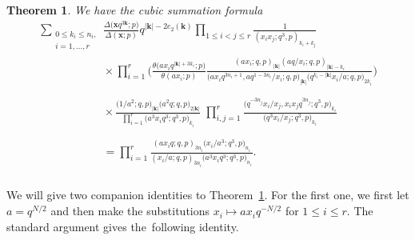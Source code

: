 \documentclass[pdftex]{sigma}%
\numberwithin{equation}{section}
\newtheorem{Theorem}{Theorem}[section]
\def\ta{\theta}
\newcommand\bk{\mathbf k}
\newcommand\bx{\mathbf x}
\begin{document}
\begin{Theorem}\label{cqst}
We have the cubic summation formula
\begin{gather*}
\sum_{\substack{0\leq k_i\leq n_i,\\i=1,\dots,r}}
\frac{\Delta\big(\bx q^{3\bk};p\big)}{\Delta(\bx;p)}q^{|\bk|-2e_2(\bk)}
\prod\limits_{1\le i<j\le r}\frac 1{(x_ix_j;q^3,p) _{k_i+k_j}}
\\[-1ex] \phantom{\sum_{\substack{0\leq k_i\leq n_i,\\i=1,\dots,r}}}
\times\prod\limits_{i=1}^{r}\bigg(\frac{\ta\big(ax_iq^{|\bk|+3k_i};p\big)}{\ta(ax_i;p)}
\frac {(ax_i;q,p)_{|\bk|}
(aq/x_i;q,p)_{|\bk|-k_i}}
{\big(ax_iq^{3n_i+1},aq^{1-3n_i}/x_i;q,p\big)_{|\bk|}\big(q^{k_i-|\bk|}x_i/a;q,p\big)_{2k_i}}\bigg)
\\[-1ex] \phantom{\sum_{\substack{0\leq k_i\leq n_i,\\i=1,\dots,r}}}
\times\frac{\big(1/a^2;q,p\big)_{|\bk|}\big(a^2q;q,p\big)_{2|\bk|}}
{\prod\limits_{i=1}^{r}\big(a^3x_iq^3;q^3,p\big)_{k_i}}\;
\prod\limits_{i,j=1} ^{r}\frac{\big(q^{-3n_j}x_i/x_j,x_ix_jq^{3n_j};q^3,p\big)_{k_i}}
{\big(q^3x_i/x_j;q^3,p\big)_{k_i}}
\\[-1ex] \phantom{\sum_{\substack{0\leq k_i\leq n_i,\\i=1,\dots,r}}}
=\prod\limits_{i=1} ^{r}\frac{(ax_iq;q,p)_{3n_i}\big(x_i/a^3;q^3,p\big)_{n_i}}
{(x_i/a;q,p)_{3n_i}\big(a^3x_iq^3;q^3,p\big)_{n_i}}.
\end{gather*}
\end{Theorem}

We will give two companion identities to Theorem~\ref{cqst}. For the first one, we first let $a=q^{N/2}$ and then make the substitutions
$x_i\mapsto a x_iq^{-N/2}$ for $1\leq i\leq r$. The standard argument gives the~following identity.
\end{document}
